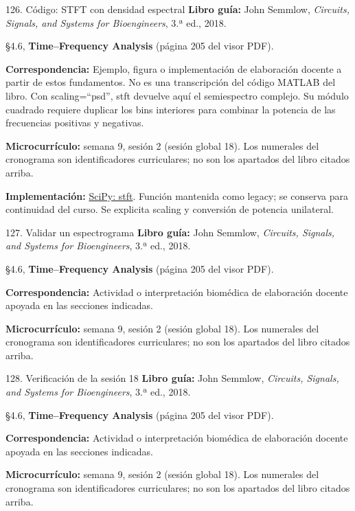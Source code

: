 \documentclass[
  10pt,
  ignorenonframetext,
  aspectratio=169,
  spanish,
]{beamer}
\begin{document}
\begin{frame}{126. Código: STFT con densidad espectral}
\label{cuxf3digo-stft-con-densidad-espectral}
\textbf{Libro guía:} John Semmlow, \emph{Circuits, Signals, and Systems
for Bioengineers}, 3.ª ed., 2018.

§4.6, \textbf{Time--Frequency Analysis} (página 205 del visor PDF).

\textbf{Correspondencia:} Ejemplo, figura o implementación de
elaboración docente a partir de estos fundamentos. No es una
transcripción del código MATLAB del libro. Con scaling=``psd'', stft
devuelve aquí el semiespectro complejo. Su módulo cuadrado requiere
duplicar los bins interiores para combinar la potencia de las
frecuencias positivas y negativas.

\textbf{Microcurrículo:} semana 9, sesión 2 (sesión global 18). Los
numerales del cronograma son identificadores curriculares; no son los
apartados del libro citados arriba.

\textbf{Implementación:}
\href{https://docs.scipy.org/doc/scipy/reference/generated/scipy.signal.stft.html}{SciPy:
stft}. Función mantenida como legacy; se conserva para continuidad del
curso. Se explicita scaling y conversión de potencia unilateral.
\end{frame}

\begin{frame}{127. Validar un espectrograma}
\label{validar-un-espectrograma}
\textbf{Libro guía:} John Semmlow, \emph{Circuits, Signals, and Systems
for Bioengineers}, 3.ª ed., 2018.

§4.6, \textbf{Time--Frequency Analysis} (página 205 del visor PDF).

\textbf{Correspondencia:} Actividad o interpretación biomédica de
elaboración docente apoyada en las secciones indicadas.

\textbf{Microcurrículo:} semana 9, sesión 2 (sesión global 18). Los
numerales del cronograma son identificadores curriculares; no son los
apartados del libro citados arriba.
\end{frame}

\begin{frame}{128. Verificación de la sesión 18}
\label{verificaciuxf3n-de-la-sesiuxf3n-18}
\textbf{Libro guía:} John Semmlow, \emph{Circuits, Signals, and Systems
for Bioengineers}, 3.ª ed., 2018.

§4.6, \textbf{Time--Frequency Analysis} (página 205 del visor PDF).

\textbf{Correspondencia:} Actividad o interpretación biomédica de
elaboración docente apoyada en las secciones indicadas.

\textbf{Microcurrículo:} semana 9, sesión 2 (sesión global 18). Los
numerales del cronograma son identificadores curriculares; no son los
apartados del libro citados arriba.
\end{frame}
\end{document}
